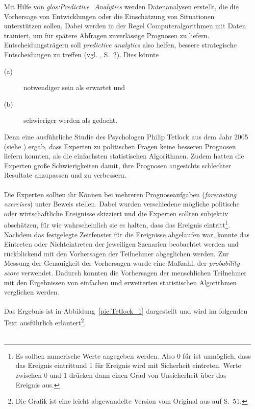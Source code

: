 Mit Hilfe von \emph{\gls{glos:Predictive_Analytics}} werden Datenanalysen
erstellt, die die Vorhersage von Entwicklungen oder die Einschätzung von
Situationen unterstützen sollen. Dabei werden in der Regel Computeralgorithmen
mit Daten trainiert, um für spätere Abfragen zuverlässige Prognosen zu liefern.
Entscheidungsträgern soll \emph{predictive analytics} also helfen, bessere
strategische Entscheidungen zu treffen (vgl. \cite{Mauerer}, S.~2). %
Dies könnte
\begin{description}
\item[(a)] notwendiger sein als erwartet und
\item[(b)] schwieriger werden als gedacht.
\end{description}
Denn eine ausführliche Studie des Psychologen Philip Tetlock aus dem Jahr 2005
(siehe \cite{Tetlock}) ergab,
dass Experten zu politischen Fragen keine besseren Prognosen liefern konnten,
als die einfachsten statistischen Algorithmen. Zudem hatten die Experten
große Schwierigkeiten damit, ihre Prognosen angesichts schlechter Resultate
anzupassen und zu verbessern. \\ \\
Die Experten sollten ihr Können bei mehreren Prognoseaufgaben
(\emph{forecasting exercises}) unter Beweis stellen. Dabei wurden verschiedene
mögliche politische oder wirtschaftliche Ereignisse skizziert und die Experten
sollten subjektiv abschätzen, für wie wahrscheinlich sie es halten, dass das
Ereignis eintritt\footnote{Es sollten numerische Werte angegeben werden. Also
0 für  ist unmöglich, dass das Ereignis eintritt\grqq und 1 für
 Ereignis wird mit Sicherheit eintreten\grqq. Werte zwischen 0 und 1
drücken dann einen Grad von Unsicherheit über das Ereignis aus.}.
Nachdem das festgelegte Zeitfenster für die Ereignisse abgelaufen war, konnte
das Eintreten oder Nichteintreten der jeweiligen Szenarien beobachtet werden und
rückblickend mit den Vorhersagen der Teilnehmer abgeglichen werden.  
Zur Messung der Genauigkeit der Vorhersagen wurde eine Maßzahl,
der \emph{probability score} verwendet. Dadurch konnten die Vorhersagen der
menschlichen Teilnehmer mit den Ergebnissen von einfachen und erweiterten
statistischen Algorithmen verglichen werden. \\ \\
Das Ergebnis ist in Abbildung~\ref{pic:Tetlock_1} dargestellt und wird im
folgenden Text ausführlich erläutert\footnote{Die Grafik ist eine leicht 
abgewandelte Version vom Original aus \cite{Tetlock} auf S.~51.}. \\ \\
